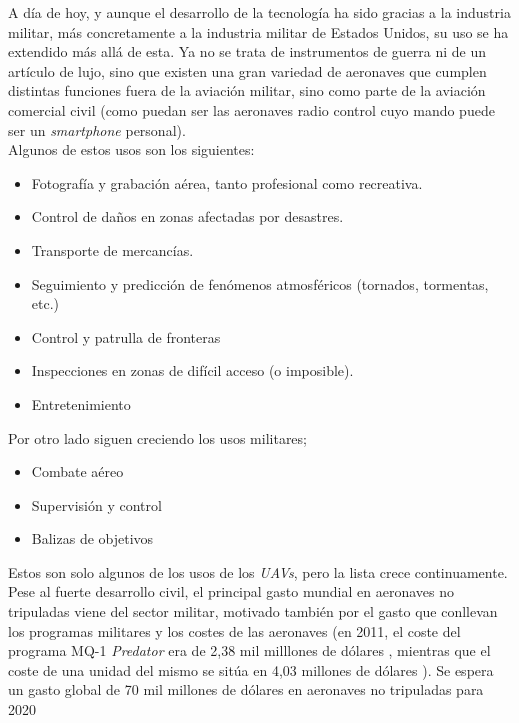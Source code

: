 A día de hoy, y aunque el desarrollo de la tecnología ha sido gracias a la industria militar, más concretamente a la industria militar de Estados Unidos, su uso se ha extendido más allá de esta. Ya no se trata de instrumentos de guerra ni de un artículo de lujo, sino que existen una gran variedad de aeronaves que cumplen distintas funciones fuera de la aviación militar, sino como parte de la aviación comercial civil (como puedan ser las aeronaves radio control cuyo mando puede ser un \emph{smartphone} personal).\\

Algunos de estos usos son los siguientes:

\begin{itemize}
	\item Fotografía y grabación aérea, tanto profesional como recreativa.
	\item Control de daños en zonas afectadas por desastres.
	\item Transporte de mercancías.
	\item Seguimiento y predicción de fenómenos atmosféricos (tornados, tormentas, etc.)
	\item Control y patrulla de fronteras
	\item Inspecciones en zonas de difícil acceso (o imposible).
	\item Entretenimiento
\end{itemize}

Por otro lado siguen creciendo los usos militares;

\begin{itemize}
	\item Combate aéreo
	\item Supervisión y control
	\item Balizas de objetivos
\end{itemize}

Estos son solo algunos de los usos de los \emph{UAVs}, pero la lista crece continuamente.\\

Pese al fuerte desarrollo civil, el principal gasto mundial en aeronaves no tripuladas viene del sector militar, motivado también por el gasto que conllevan los programas militares y los costes de las aeronaves (en 2011, el coste del programa MQ-1 \emph{Predator} era de 2,38 mil milllones de dólares \citep{Predatorunitbudget}, mientras que el coste de una unidad del mismo se sitúa en 4,03 millones de dólares \citep{Predatorprogrambudget}). Se espera un gasto global de 70 mil millones de dólares en aeronaves no tripuladas para 2020 \citep{Goldman}\\


